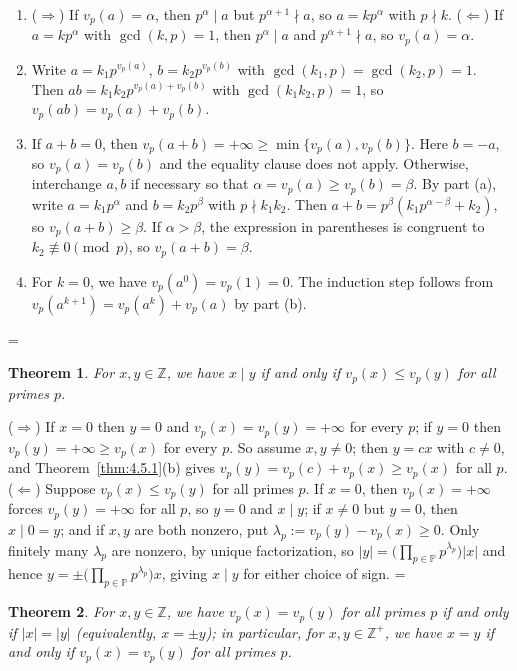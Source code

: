 \documentclass[11pt]{article}
\makeatletter
\theoremstyle{ntstyle}
\newtheorem{theorem}{Theorem}[subsection]
\let\nt@closedisplay\]
\def\nt@guardedclose{\@ifnextchar\par{\nt@closeafterpar}{\@ifnextchar\end{\postdisplaypenalty\@M\nt@closedisplay}{\nt@closedisplay}}}
\def\nt@closeafterpar\par{\@ifnextchar\par{\nt@closeafterpar}{\@ifnextchar\end{\postdisplaypenalty\@M\nt@closedisplay\par}{\nt@closedisplay\par}}}
\renewenvironment{proof}[1][\proofname]{\par
  \pushQED{\qed}\normalfont\topsep\medskipamount\edef\nt@afterproof{\@endparpenalty=\the\@endparpenalty\relax}\@beginparpenalty\@M\@endparpenalty\@M\let\]\nt@guardedclose\trivlist\item[]\textit{#1\@addpunct{.}} \ignorespaces}{\ifvmode\addpenalty\@M\fi\popQED\nt@afterproof\endtrivlist\@endpefalse}
\newcommand{\Primes}{\mathbb{P}}
\makeatother
\begin{document}
\begin{proof}

	\begin{enumerate}[label={\alph*)}]
		\item ($\Rightarrow$) If $v_p(a) = \alpha$, then $p^{\alpha} \mid
						a$ but $p^{\alpha+1} \nmid a$, so $a = k p^{\alpha}$ with $p \nmid
						k$. ($\Leftarrow$) If $a = k p^{\alpha}$ with $\gcd(k, p) = 1$, then
					$p^{\alpha} \mid a$ and $p^{\alpha+1} \nmid a$, so $v_p(a) = \alpha$.
		\item Write $a = k_1 p^{v_p(a)}$, $b = k_2 p^{v_p(b)}$ with
					$\gcd(k_1, p) = \gcd(k_2, p) = 1$. Then $ab = k_1 k_2 p^{v_p(a) +
								v_p(b)}$ with $\gcd(k_1 k_2, p) = 1$, so $v_p(ab) = v_p(a) + v_p(b)$.
		\item If $a+b=0$, then $v_p(a+b)=+\infty\ge\min\{v_p(a),v_p(b)\}$.
					Here $b=-a$, so $v_p(a)=v_p(b)$ and the equality clause does not apply.
					Otherwise, interchange $a,b$ if necessary so that
					$\alpha=v_p(a)\ge v_p(b)=\beta$. By part (a), write
					$a=k_1p^{\alpha}$ and $b=k_2p^{\beta}$ with $p\nmid k_1k_2$.
					Then $a+b=p^{\beta}(k_1p^{\alpha-\beta}+k_2)$, so
					$v_p(a+b)\ge\beta$. If $\alpha>\beta$, the expression in parentheses
					is congruent to $k_2\not\equiv0\pmod{p}$, so $v_p(a+b)=\beta$.
		\item For $k=0$, we have $v_p(a^0)=v_p(1)=0$.
					The induction step follows from
					$v_p(a^{k+1})=v_p(a^k)+v_p(a)$ by part (b).\qedhere
	\end{enumerate}
\end{proof}
\begin{theorem}\label{thm:4.5.2} For $x, y \in \mathbb{Z}$, we have $x \mid y$ if and only if $v_p(x) \le v_p(y)$
	for all primes $p$.
\end{theorem}

\begin{proof} ($\Rightarrow$) If $x=0$ then $y=0$ and
	$v_p(x)=v_p(y)=+\infty$ for every $p$; if $y=0$ then
	$v_p(y)=+\infty\ge v_p(x)$ for every $p$. So assume $x,y\neq0$; then
	$y=cx$ with $c\neq0$, and Theorem~\ref{thm:4.5.1}(b) gives
	$v_p(y)=v_p(c)+v_p(x)\ge v_p(x)$ for all $p$.
	($\Leftarrow$) Suppose $v_p(x) \le v_p(y)$ for all primes $p$. If $x = 0$, then $v_p(x) = +\infty$
	forces $v_p(y) = +\infty$ for all $p$, so $y = 0$ and $x \mid y$; if $x \neq 0$ but $y = 0$, then
	$x \mid 0 = y$; and if $x,y$ are both nonzero, put $\lambda_p:=v_p(y)-v_p(x)\ge0$.
	Only finitely many $\lambda_p$ are nonzero, by unique factorization, so $|y| =
	\big(\prod_{p\in\Primes} p^{\lambda_p}\big)|x|$ and hence $y = \pm\big(\prod_{p\in\Primes}
	p^{\lambda_p}\big) x$, giving $x \mid y$ for either choice of sign.
\end{proof}
\begin{theorem}\label{thm:4.5.3} For $x, y \in \mathbb{Z}$, we have $v_p(x) = v_p(y)$ for all primes $p$ if and only if $|x| = |y|$ (equivalently, $x = \pm y$); in particular, for $x, y \in \mathbb{Z}^+$, we have $x = y$ if and only if $v_p(x) = v_p(y)$ for all primes $p$.
\end{theorem}
\end{document}
